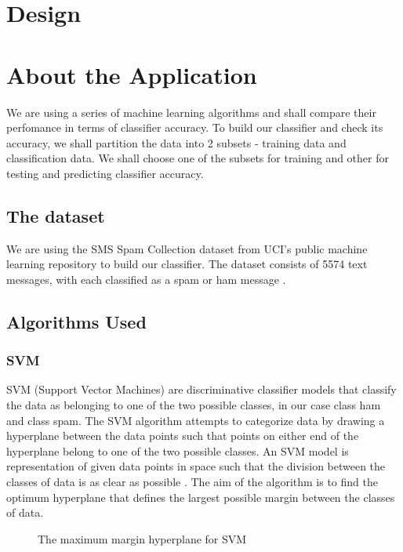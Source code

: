 \documentclass[9pt,twocolumn,twoside]{../../styles/osajnl}
\begin{document}
\section{Design}

\section{About the Application}
We are using a series of machine learning algorithms and shall compare
their perfomance in terms of classifier accuracy. To build our
classifier and check its accuracy, we shall partition the data into 2
subsets - training data and classification data. We shall choose one
of the subsets for training and other for testing and predicting
classifier accuracy.

\subsection{The dataset}
We are using the SMS Spam Collection dataset from UCI's
public machine learning repository to build our classifier. The
dataset consists of 5574 text messages, with each classified as a spam
or ham message \cite{www-sms_spam_collection}.

\subsection{Algorithms Used}

\subsubsection{SVM}
SVM (Support Vector Machines) are discriminative classifier models
that classify the data as belonging to one of the two possible
classes, in our case class ham and class spam. The SVM algorithm
attempts to categorize data by drawing a hyperplane between the data
points such that points on either end of the hyperplane belong to one
of the two possible classes. An SVM model is representation of given
data points in space such that the division between the classes of
data is as clear as possible \cite{www-svm-wiki}. The aim of the algorithm
is to find the optimum hyperplane that defines the largest possible
margin between the classes of data.

\begin{figure}[htbp]
\centering
{}
\caption{The maximum margin hyperplane for SVM \cite{www-svm-tutorial}}
\label{fig:The maximum margin hyperplane for SVM}
\end{figure}
\end{document}
